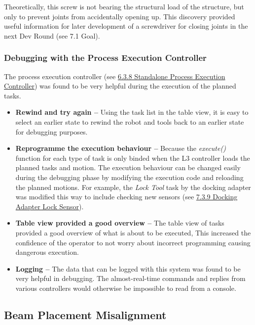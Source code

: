 {Theoretically, this screw is not bearing the structural load of the structure, but only to prevent joints from accidentally opening up. This discovery provided useful information for later development of a screwdriver for closing joints in the next Dev Round (see 7.1 Goal). 

\subsubsection{Debugging with the Process Execution Controller}

The process execution controller (see \ul{6.3.8 Standalone Process Execution Controller}) was found to be very helpful during the execution of the planned tasks. 

\begin{itemize}
	\item \textbf{Rewind and try again --} Using the task list in the table view, it is easy to select an earlier state to rewind the robot and tools back to an earlier state for debugging purposes.

	\item \textbf{Reprogramme the execution behaviour --} Because the \textit{execute() }function for each type of task is only binded when the L3 controller loads the planned tasks and motion. The execution behaviour can be changed easily during the debugging phase by modifying the execution code and reloading the planned motions. For example, the \textit{Lock Tool }task by the docking adapter was modified this way to include checking new sensors (see \ul{7.3.9 Docking Adapter Lock Sensor}).

	\item \textbf{Table view provided a good overview --} The table view of tasks provided a good overview of what is about to be executed, This increased the confidence of the operator to not worry about incorrect programming causing dangerous execution.

	\item \textbf{Logging --} The data that can be logged with this system was found to be very helpful in debugging. The almost-real-time commands and replies from various controllers would otherwise be impossible to read from a console.

\end{itemize}
\subsection{Beam Placement Misalignment}

}
